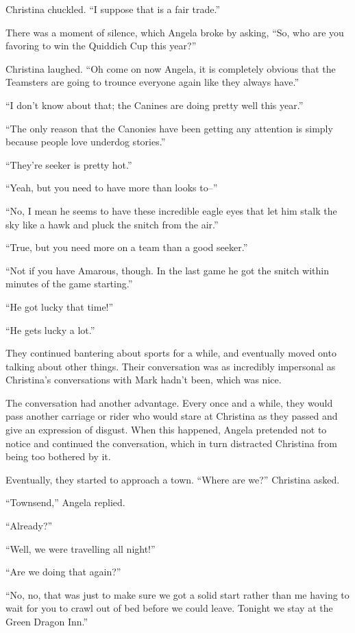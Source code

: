 \documentclass[showtrims,b6paper,draft,10pt]{memoir}
\begin{document}
Christina chuckled.  ``I suppose that is a fair trade.''

There was a moment of silence, which Angela broke by asking, ``So, who are you favoring to win the Quiddich Cup this year?''

Christina laughed.  ``Oh come on now Angela, it is completely obvious that the Teamsters are going to trounce everyone again like they always have.''

``I don't know about that;  the Canines are doing pretty well this year.''

``The only reason that the Canonies have been getting any attention is simply because people love underdog stories.''

``They're seeker is pretty hot.''

``Yeah, but you need to have more than looks to--''

``No, I mean he seems to have these incredible eagle eyes that let him stalk the sky like a hawk and pluck the snitch from the air.''

``True, but you need more on a team than a good seeker.''

``Not if you have Amarous, though.  In the last game he got the snitch within minutes of the game starting.''

``He got lucky that time!''

``He gets lucky a lot.''

They continued bantering about sports for a while, and eventually moved onto talking about other things.  Their conversation was as incredibly impersonal as Christina's conversations with Mark hadn't been, which was nice.

The conversation had another advantage.  Every once and a while, they would pass another carriage or rider who would stare at Christina as they passed and give an expression of disgust.  When this happened, Angela pretended not to notice and continued the conversation, which in turn distracted Christina from being too bothered by it.

Eventually, they started to approach a town.  ``Where are we?''  Christina asked.

``Townsend,'' Angela replied.

``Already?''

``Well, we were travelling all night!''

``Are we doing that again?''

``No, no, that was just to make sure we got a solid start rather than me having to wait for you to crawl out of bed before we could leave.  Tonight we stay at the Green Dragon Inn.''
\end{document}
